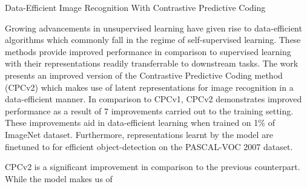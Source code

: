 \documentclass[11pt,letterpaper]{article}
\begin{document}
\begin{center}
  \large{Data-Efficient Image Recognition With Contrastive Predictive Coding}
\end{center}


Growing advancements in unsupervised learning have given rise to data-efficient algorithms which commonly fall in the regime of self-supervised learning. These methods provide improved performance in comparison to supervised learning with their representations readily transferrable to downstream tasks. The work presents an improved version of the Contrastive Predictive Coding method (CPCv2) which makes use of latent representations for image recognition in a data-efficient manner. In comparison to CPCv1, CPCv2 demonstrates improved performance as a result of 7 improvements carried out to the training setting. These improvements aid in data-efficient learning when trained on 1\% of ImageNet dataset. Furthermore, representations learnt by the model are finetuned to for efficient object-detection on the PASCAL-VOC 2007 dataset.

CPCv2 is a significant improvement in comparison to the previous counterpart. While the model makes us of 
\end{document}
